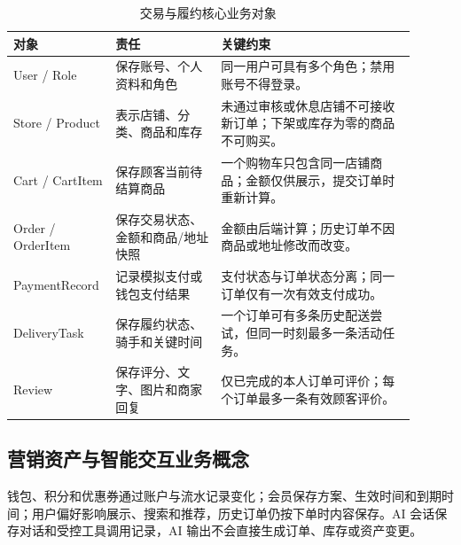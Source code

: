 \begin{longtable}{|L{0.19\linewidth}|L{0.25\linewidth}|L{0.46\linewidth}|}
\caption{交易与履约核心业务对象}\label{tab:domain-objects}\\ \hline
\textbf{对象} & \textbf{责任} & \textbf{关键约束} \\ \hline
User / Role & 保存账号、个人资料和角色 & 同一用户可具有多个角色；禁用账号不得登录。 \\ \hline
Store / Product & 表示店铺、分类、商品和库存 & 未通过审核或休息店铺不可接收新订单；下架或库存为零的商品不可购买。 \\ \hline
Cart / CartItem & 保存顾客当前待结算商品 & 一个购物车只包含同一店铺商品；金额仅供展示，提交订单时重新计算。 \\ \hline
Order / OrderItem & 保存交易状态、金额和商品/地址快照 & 金额由后端计算；历史订单不因商品或地址修改而改变。 \\ \hline
Payment\-Record & 记录模拟支付或钱包支付结果 & 支付状态与订单状态分离；同一订单仅有一次有效支付成功。 \\ \hline
DeliveryTask & 保存履约状态、骑手和关键时间 & 一个订单可有多条历史配送尝试，但同一时刻最多一条活动任务。 \\ \hline
Review & 保存评分、文字、图片和商家回复 & 仅已完成的本人订单可评价；每个订单最多一条有效顾客评价。 \\ \hline
\end{longtable}


\subsection{营销资产与智能交互业务概念}

钱包、积分和优惠券通过账户与流水记录变化；会员保存方案、生效时间和到期时间；用户偏好影响展示、搜索和推荐，历史订单仍按下单时内容保存。AI 会话保存对话和受控工具调用记录，AI 输出不会直接生成订单、库存或资产变更。

